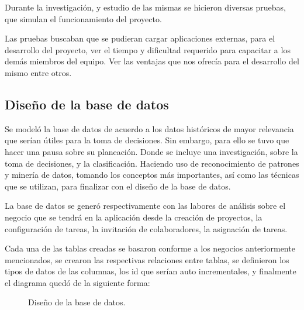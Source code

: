 Durante la investigación, y estudio de las mismas se hicieron diversas pruebas, que simulan el funcionamiento del proyecto. 

Las pruebas buscaban que se pudieran cargar aplicaciones externas, para el desarrollo del proyecto, ver el tiempo y dificultad requerido para capacitar a los demás miembros del equipo. Ver las ventajas que nos ofrecía para el desarrollo del mismo entre otros. 
\subsection{Diseño de la base de datos}
Se modeló la base de datos de acuerdo a los datos históricos de mayor relevancia que serían útiles para la toma de decisiones. Sin embargo, para ello se tuvo que hacer una pausa sobre su planeación. Donde se incluye una investigación, sobre la toma de decisiones, y la clasificación. Haciendo uso de reconocimiento de patrones y minería de datos, tomando los conceptos más importantes, así como las técnicas que se utilizan, para finalizar con el diseño de la base de datos. 

La base de datos se generó respectivamente con las labores de análisis sobre el negocio que se tendrá en la aplicación desde la creación de proyectos, la configuración de tareas, la invitación de colaboradores, la asignación de tareas. 

Cada una de las tablas creadas se basaron conforme a los negocios anteriormente mencionados, se crearon las respectivas relaciones entre tablas, se definieron los tipos de datos de las columnas, los id que serían auto incrementales, y finalmente el diagrama quedó de la siguiente forma: 

\begin{figure}[htbp!]
	\begin{center}
		\caption{Diseño de la base de datos.}
		\label{fig:BaseDatos}
	\end{center}
\end{figure}

